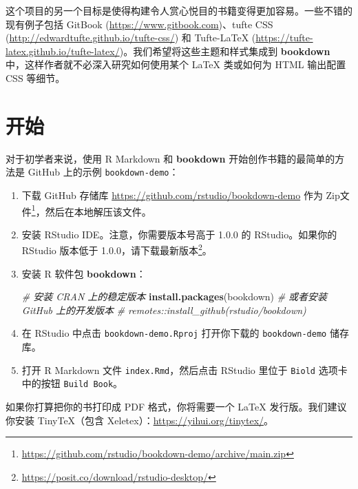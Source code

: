 \documentclass[
  12pt,
]{krantz}
\makeatletter
\newenvironment{Shaded}{\begin{snugshade}}{\end{snugshade}}
\newcommand{\CommentTok}[1]{\textcolor[rgb]{0.56,0.35,0.01}{\textit{#1}}}
\newcommand{\FunctionTok}[1]{\textcolor[rgb]{0.13,0.29,0.53}{\textbf{#1}}}
\newcommand{\NormalTok}[1]{#1}
\newcommand{\StringTok}[1]{\textcolor[rgb]{0.31,0.60,0.02}{#1}}
\renewcommand{\href}[2]{#2\footnote{\url{#1}}}
\newenvironment{kframe}{%
\medskip{}
\setlength{\fboxsep}{.8em}
 \def\at@end@of@kframe{}%
 \ifinner\ifhmode%
  \def\at@end@of@kframe{\end{minipage}}%
  \begin{minipage}{\columnwidth}%
 \fi\fi%
 \def\FrameCommand##1{\hskip\@totalleftmargin \hskip-\fboxsep
 \colorbox{shadecolor}{##1}\hskip-\fboxsep
     \hskip-\linewidth \hskip-\@totalleftmargin \hskip\columnwidth}%
 \MakeFramed {\advance\hsize-\width
   \@totalleftmargin\z@ \linewidth\hsize
   \@setminipage}}%
 {\par\unskip\endMakeFramed%
 \at@end@of@kframe}
\newenvironment{rmdblock}[1]
  {
  \begin{itemize}
  \renewcommand{\labelitemi}{
    \raisebox{-.7\height}[0pt][0pt]{
      {\setkeys{Gin}{width=3em,keepaspectratio}\texttt{[image: images/\#1]}}
    }
  }
  \setlength{\fboxsep}{1em}
  \begin{kframe}
  \item
  }
  {
  \end{kframe}
  \end{itemize}
  }
\newenvironment{rmdnote}
  {\begin{rmdblock}{note}}
  {\end{rmdblock}}
\theoremstyle{definition}
\theoremstyle{definition}
\theoremstyle{definition}
\theoremstyle{definition}
\theoremstyle{remark}
\makeatother
\begin{document}
这个项目的另一个目标是使得构建令人赏心悦目的书籍变得更加容易。一些不错的现有例子包括 GitBook (\url{https://www.gitbook.com})、tufte CSS (\url{http://edwardtufte.github.io/tufte-css/}) 和 Tufte-LaTeX (\url{https://tufte-latex.github.io/tufte-latex/})。我们希望将这些主题和样式集成到 \textbf{bookdown} 中，这样作者就不必深入研究如何使用某个 LaTeX 类或如何为 HTML 输出配置 CSS 等细节。

\hypertarget{ux5f00ux59cb}{%
\section{开始}\label{ux5f00ux59cb}}

对于初学者来说，使用 R Markdown 和 \textbf{bookdown} 开始创作书籍的最简单的方法是 GitHub 上的示例 \texttt{bookdown-demo}：

\begin{enumerate}
\def\labelenumi{\arabic{enumi}.}
\item
  下载 GitHub 存储库 \url{https://github.com/rstudio/bookdown-demo} 作为 \href{https://github.com/rstudio/bookdown-demo/archive/main.zip}{Zip文件}，然后在本地解压该文件。
\item
  安装 RStudio IDE。注意，你需要版本号高于 1.0.0 的 RStudio。如果你的 RStudio 版本低于 1.0.0，请\href{https://posit.co/download/rstudio-desktop/}{下载最新版本}。
\item
  安装 R 软件包 \textbf{bookdown}：

\begin{Shaded}
\begin{Highlighting}[]
\CommentTok{\# 安装 CRAN 上的稳定版本}
\FunctionTok{install.packages}\NormalTok{(}\StringTok{\textquotesingle{}bookdown\textquotesingle{}}\NormalTok{)}
\CommentTok{\# 或者安装 GitHub 上的开发版本}
\CommentTok{\# remotes::install\_github(\textquotesingle{}rstudio/bookdown\textquotesingle{})}
\end{Highlighting}
\end{Shaded}
\item
  在 RStudio 中点击 \texttt{bookdown-demo.Rproj} 打开你下载的 \texttt{bookdown-demo} 储存库。
\item
  打开 R Markdown 文件 \texttt{index.Rmd}，然后点击 RStudio 里位于 \texttt{Biold} 选项卡中的按钮 \texttt{Build\ Book}。
\end{enumerate}

\begin{rmdnote}
如果你打算把你的书打印成 PDF 格式，你将需要一个 LaTeX 发行版。我们建议你安装 TinyTeX（包含 Xeletex）：\url{https://yihui.org/tinytex/}。
\end{rmdnote}
\end{document}
